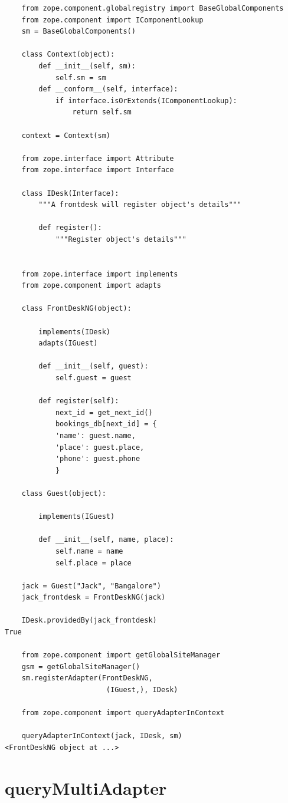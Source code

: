 \documentclass[a4paper,openany,twoside,draft]{book}
\begin{document}
\begin{verbatim}
    from zope.component.globalregistry import BaseGlobalComponents
    from zope.component import IComponentLookup
    sm = BaseGlobalComponents()

    class Context(object):
        def __init__(self, sm):
            self.sm = sm
        def __conform__(self, interface):
            if interface.isOrExtends(IComponentLookup):
                return self.sm

    context = Context(sm)

    from zope.interface import Attribute
    from zope.interface import Interface

    class IDesk(Interface):
        """A frontdesk will register object's details"""

        def register():
            """Register object's details"""


    from zope.interface import implements
    from zope.component import adapts

    class FrontDeskNG(object):

        implements(IDesk)
        adapts(IGuest)

        def __init__(self, guest):
            self.guest = guest

        def register(self):
            next_id = get_next_id()
            bookings_db[next_id] = {
            'name': guest.name,
            'place': guest.place,
            'phone': guest.phone
            }

    class Guest(object):

        implements(IGuest)

        def __init__(self, name, place):
            self.name = name
            self.place = place

    jack = Guest("Jack", "Bangalore")
    jack_frontdesk = FrontDeskNG(jack)

    IDesk.providedBy(jack_frontdesk)
True

    from zope.component import getGlobalSiteManager
    gsm = getGlobalSiteManager()
    sm.registerAdapter(FrontDeskNG,
                        (IGuest,), IDesk)

    from zope.component import queryAdapterInContext

    queryAdapterInContext(jack, IDesk, sm)
<FrontDeskNG object at ...>
\end{verbatim}


\section*{queryMultiAdapter%
  \label{querymultiadapter}%
}
\end{document}
